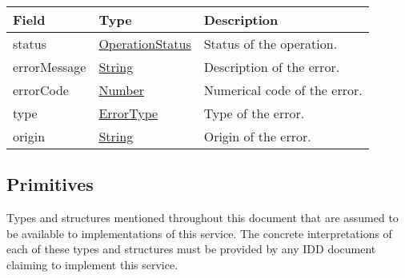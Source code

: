 \documentclass[a4paper]{arrowhead}
\newcommand{\pref}[1]{{\textcolor{ArrowheadGrey}{\hyperref[sec:model:primitives:#1]{#1}}}}
\begin{document}

\begin{table}[ht!]
\begin{tabularx}{\textwidth}{| p{4.25cm} | p{3.5cm} | X |} \hline
\rowcolor{gray!33} Field & Type      & Description \\ \hline
status & \pref{OperationStatus} & Status of the operation. \\ \hline
errorMessage & \pref{String} & Description of the error. \\ \hline
errorCode &\pref{Number}  & Numerical code of the error. \\ \hline
type & \pref{ErrorType} & Type of the error. \\ \hline
origin & \pref{String} & Origin of the error. \\ \hline
\end{tabularx}
\end{table}

\clearpage

\subsection{Primitives}
\label{sec:model:primitives}

Types and structures mentioned throughout this document that are assumed to be available to implementations of this service.
The concrete interpretations of each of these types and structures must be provided by any IDD document claiming to implement this service.
\end{document}
